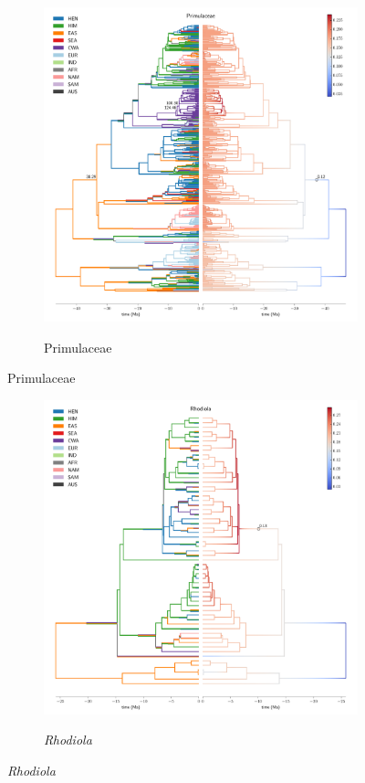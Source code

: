 \begin{figure}
  \ContinuedFloat
\begin{subfigure}{\textwidth}
\centering
\includegraphics[width=.99\linewidth]{figures/Primulaceae-supfig.pdf}
\label{fig:allium}
\caption{Primulaceae}
\end{subfigure}
\end{figure}

\begin{figure}
  \ContinuedFloat
\begin{subfigure}{\textwidth}
\centering
\includegraphics[width=.99\linewidth]{figures/Rhodiola-supfig.pdf}
\label{fig:allium}
\caption{\textit{Rhodiola}}
\end{subfigure}
\end{figure}

